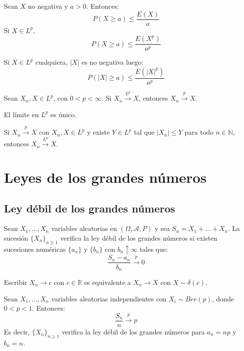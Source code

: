 \begin{proposition}
    Sean $X$ no negativa y $a > 0$.
    Entonces:
    $$P(X \geq a) \leq \frac{E(X)}{a}$$
    Si $X \in L^p$,
    $$P(X \geq a) \leq \frac{E(X^p)}{a^p}$$
\end{proposition}

\begin{remark}
    Si $X \in L^p$ cualquiera, $|X|$ es no negativa luego:
    $$P(|X| \geq a) \leq \frac{E(|X|^p)}{a^p}$$
\end{remark}

\begin{theorem}
    Sean $X_n, X \in L^p$, con $0 < p < \infty$.
    Si $X_n \xrightarrow{L^p} X$, entonces $X_n \xrightarrow{p} X$.
\end{theorem}

\begin{theorem}
    El límite en $L^p$ es único.
\end{theorem}

\begin{theorem}
    Si $X_n \xrightarrow{p} X$ con $X_n, X \in L^p$ y existe $Y \in L^p$ tal que $|X_n| \leq Y$ para todo $n \in \mathbb{N}$, entonces $X_n \xrightarrow{L^p} X$.
\end{theorem}

\section{Leyes de los grandes números}
\subsection*{Ley débil de los grandes números}
Sean $X_1, \dots, X_n$ variables aleatorias en $(\Omega, \mathcal{A}, P)$ y sea $S_n = X_1 + \dots + X_n$.
La sucesión $\{X_n\}_{n \geq 1}$ verifica la ley débil de los grandes números si existen sucesiones numéricas $\{a_n\}$ y $\{b_n\}$ con $b_n \uparrow \infty$ tales que:
$$\frac{S_n - a_n}{b_n} \xrightarrow{p} 0$$

\begin{note}
    Escribir $X_n \to c$ con $c \in \mathbb{R}$ es equivalente a $X_n \to X$ con $X \sim \delta(c)$.
\end{note}

\begin{theorem}[Bernoulli]
    Sean $X_1, \dots, X_n$ variables aleatorias independientes con $X_i \sim Ber(p)$, donde $0 < p < 1$.
    Entonces:
    $$\frac{S_n}{n} \xrightarrow{p} p$$
    Es decir, $\{X_n\}_{n \geq 1}$ verifica la ley débil de los grandes números para $a_n = np$ y $b_n = n$.
\end{theorem}

